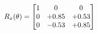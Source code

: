 \documentclass[preview]{standalone}
\begin{document}
\begin{align*}
\special{dvisvgm:raw <g id='unique000'>}R_{x}(\theta) = \begin{bmatrix}1 & 0 & 0 \\0 & +0.85 & +0.53 \\0 & -0.53 & +0.85\end{bmatrix}\special{dvisvgm:raw </g>}
\end{align*}
\end{document}
